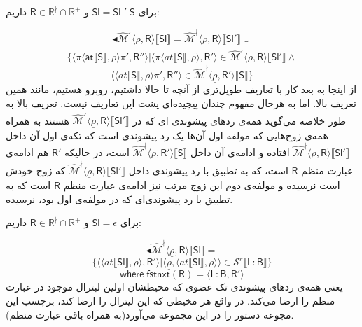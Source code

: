 برای $\mathsf{Sl=SL' \; S}$ و $\mathsf{R} \in \mathbb{R^\nmid} \cap \mathbb{R^+}$ داریم:

$$\blacktriangleleft\mathcal{\hat{M}^\nmid} \langle \underline{\rho}, \mathsf{R} \rangle \llbracket \mathsf{Sl} \rrbracket
=
\mathcal{\hat{M}^\nmid} \langle \underline{\rho}, \mathsf{R} \rangle \llbracket \mathsf{Sl'} \rrbracket
\cup$$ 
$$\{ \langle \pi \langle \mathsf{at}\llbracket \mathsf{S} \rrbracket, \rho \rangle \pi'
, \mathsf{R''} \rangle | \langle \pi \langle at \llbracket \mathsf{S}\rrbracket, \rho \rangle, \mathsf{R'} \rangle \in \mathcal{\hat{M}^\nmid}  \langle \underline{\rho} , \mathsf{R} \rangle \llbracket \mathsf{Sl'} \rrbracket\land$$
 $$\langle \langle at \llbracket \mathsf{S}\rrbracket , \rho \rangle \pi' , \mathsf{R''} \rangle \in \mathcal{\hat{M}^\nmid}
\langle \underline{\rho},\mathsf{R'} \rangle   \llbracket \mathsf{S} \rrbracket
 \}$$
از اینجا به بعد کار با تعاریف طویل‌تری از آنچه تا حالا داشتیم، روبرو هستیم، مانند همین تعریف بالا. اما به هرحال مفهوم چندان پیچیده‌ای پشت این تعاریف نیست. تعریف بالا به طور خلاصه می‌گوید همه‌ی ردهای پیشوندی ‌ای که در 
$\mathcal{\hat{M}^\nmid} \langle \underline{\rho}, \mathsf{R} \rangle \llbracket \mathsf{Sl'} \rrbracket$
هستند به همراه همه‌ی زوج‌هایی که مولفه اول آن‌ها یک رد پیشوندی است که تکه‌ی اول آن داخل 
$\mathcal{\hat{M}^\nmid} \langle \underline{\rho}, \mathsf{R} \rangle \llbracket \mathsf{Sl'} \rrbracket$
افتاده و ادامه‌ی آن داخل 
$\mathcal{\hat{M}^\nmid} \langle \underline{\rho}, \mathsf{R'} \rangle \llbracket \mathsf{S} \rrbracket$
است، در حالیکه $\mathsf{R'}$ هم ادامه‌ی عبارت منظم $\mathsf{R}$ است، که به تطبیق با رد پیشوندی   داخل  
$\mathcal{\hat{M}^\nmid} \langle \underline{\rho}, \mathsf{R} \rangle \llbracket \mathsf{Sl'} \rrbracket$
که زوج خودش است نرسیده و مولفه‌ی دوم این زوج مرتب نیز ادامه‌ی عبارت منظم $\mathsf{R}$ است که به تطبیق با رد پیشوندی‌ای که در مولفه‌ی اول بود، نرسیده.

برای $\mathsf{Sl=\epsilon}$ و $\mathsf{R} \in \mathbb{R^\nmid} \cap \mathbb{R^+}$ داریم:

$$\blacktriangleleft\mathcal{\hat{M}^\nmid} \langle \underline{\rho}, \mathsf{R} \rangle \llbracket \mathsf{Sl} \rrbracket
=$$
$$\{ \langle \langle at \llbracket \mathsf{Sl} \rrbracket , \rho \rangle , \mathsf{R'} \rangle | \langle \underline{\rho} , \langle at \llbracket \mathsf{Sl} \rrbracket, \rho \rangle \rangle \in \mathcal{S}^r \llbracket \mathsf{L:B} \rrbracket
\}$$
$$\mathsf{where \; fstnxt(R)=\langle L:B,R' \rangle}$$
یعنی همه‌ی ردهای پیشوندی تک عضوی که محیطشان اولین لبترال موجود در عبارت منظم را ارضا می‌کند. در واقع هر مخیطی که این لیترال را ارضا کند، برچسب این مجوعه دستور را در این مجموعه می‌آورد(به همراه باقی عبارت منظم).

